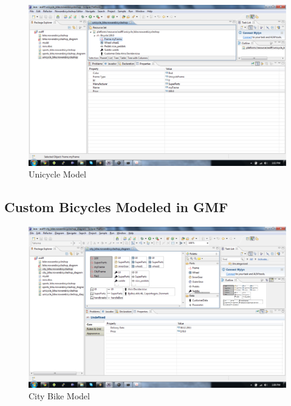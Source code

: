 \begin{figure}[H]
    \begin{center}
        \includegraphics[width=\textwidth]{fig/ecore_model_examples/new/ecore_unicycle_model.pdf}
        \caption{Unicycle Model}
        \label{fig.emf_unicycle_model}
    \end{center}
\end{figure}

\subsection{Custom Bicycles Modeled in GMF}

\begin{figure}[H]
    \begin{center}
        \includegraphics[width=\textwidth]{fig/gmf/gmf_city_model.pdf}
        \caption{City Bike Model}
        \label{fig.gmf_city_model}
    \end{center}
\end{figure}


